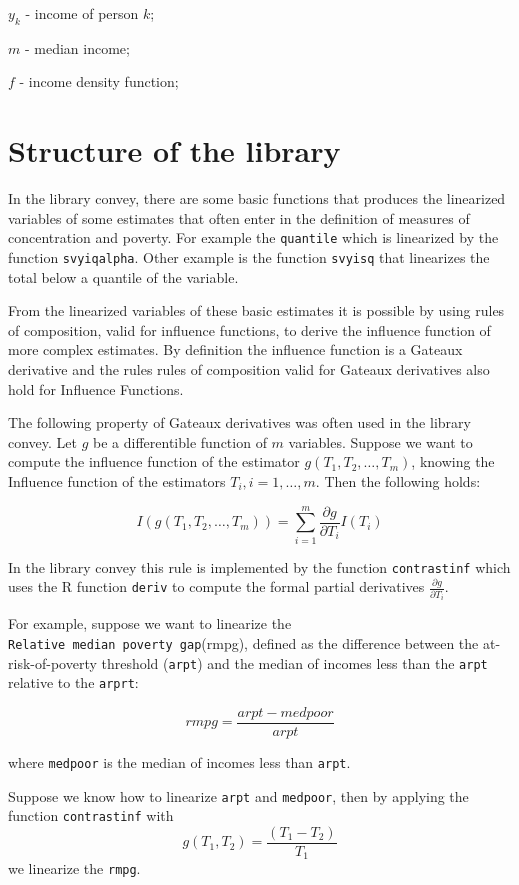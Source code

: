 \documentclass[]{book}
\begin{document}
\(y_k\) - income of person \(k\);

\(m\) - median income;

\(f\) - income density function;

\section{Structure of the library}\label{structure-of-the-library}

In the library convey, there are some basic functions that produces the
linearized variables of some estimates that often enter in the
definition of measures of concentration and poverty. For example the
\texttt{quantile} which is linearized by the function
\texttt{svyiqalpha}. Other example is the function \texttt{svyisq} that
linearizes the total below a quantile of the variable.

From the linearized variables of these basic estimates it is possible by
using rules of composition, valid for influence functions, to derive the
influence function of more complex estimates. By definition the
influence function is a Gateaux derivative and the rules rules of
composition valid for Gateaux derivatives also hold for Influence
Functions.

The following property of Gateaux derivatives was often used in the
library convey. Let \(g\) be a differentible function of \(m\)
variables. Suppose we want to compute the influence function of the
estimator \(g(T_1, T_2,\ldots, T_m)\), knowing the Influence function of
the estimators \(T_i, i=1,\ldots, m\). Then the following holds:

\[
I(g(T_1, T_2,\ldots, T_m)) = \sum_{i=1}^m \frac{\partial g}{\partial T_i}I(T_i)
\]

In the library convey this rule is implemented by the function
\texttt{contrastinf} which uses the R function \texttt{deriv} to compute
the formal partial derivatives \(\frac{\partial g}{\partial T_i}\).

For example, suppose we want to linearize the
\texttt{Relative\ median\ poverty\ gap}(rmpg), defined as the difference
between the at-risk-of-poverty threshold (\texttt{arpt}) and the median
of incomes less than the \texttt{arpt} relative to the \texttt{arprt}:

\[
rmpg= \frac{arpt-medpoor} {arpt}
\]

where \texttt{medpoor} is the median of incomes less than \texttt{arpt}.

Suppose we know how to linearize \texttt{arpt} and \texttt{medpoor},
then by applying the function \texttt{contrastinf} with \[
g(T_1,T_2)= \frac{(T_1 - T_2)}{T_1}
\] we linearize the \texttt{rmpg}.
\end{document}
